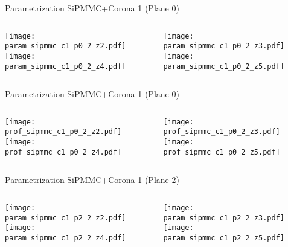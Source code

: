\documentclass{beamer}
\begin{document}
\begin{frame}{Parametrization SiPMMC+Corona 1 (Plane 0)}
	\begin{columns}[onlytextwidth]
		\begin{column}{0.5\textwidth}
			\texttt{[image: param\_sipmmc\_c1\_p0\_2\_z2.pdf]} \\
			\texttt{[image: param\_sipmmc\_c1\_p0\_2\_z4.pdf]}
		 \end{column}
		 \begin{column}{0.5\textwidth}
			\texttt{[image: param\_sipmmc\_c1\_p0\_2\_z3.pdf]} \\
			\texttt{[image: param\_sipmmc\_c1\_p0\_2\_z5.pdf]}
		 \end{column}
 \end{columns}
\end{frame}

\begin{frame}{Parametrization SiPMMC+Corona 1 (Plane 0)}
	\begin{columns}[onlytextwidth]
		\begin{column}{0.5\textwidth}
			\texttt{[image: prof\_sipmmc\_c1\_p0\_2\_z2.pdf]} \\
			\texttt{[image: prof\_sipmmc\_c1\_p0\_2\_z4.pdf]}
		 \end{column}
		 \begin{column}{0.5\textwidth}
			\texttt{[image: prof\_sipmmc\_c1\_p0\_2\_z3.pdf]} \\
			\texttt{[image: prof\_sipmmc\_c1\_p0\_2\_z5.pdf]}
		 \end{column}
 \end{columns}
\end{frame}

\begin{frame}{Parametrization SiPMMC+Corona 1 (Plane 2)}
	\begin{columns}[onlytextwidth]
		\begin{column}{0.5\textwidth}
			\texttt{[image: param\_sipmmc\_c1\_p2\_2\_z2.pdf]} \\
			\texttt{[image: param\_sipmmc\_c1\_p2\_2\_z4.pdf]}
		 \end{column}
		 \begin{column}{0.5\textwidth}
			\texttt{[image: param\_sipmmc\_c1\_p2\_2\_z3.pdf]} \\
			\texttt{[image: param\_sipmmc\_c1\_p2\_2\_z5.pdf]}
		 \end{column}
 \end{columns}
\end{frame}
\end{document}
